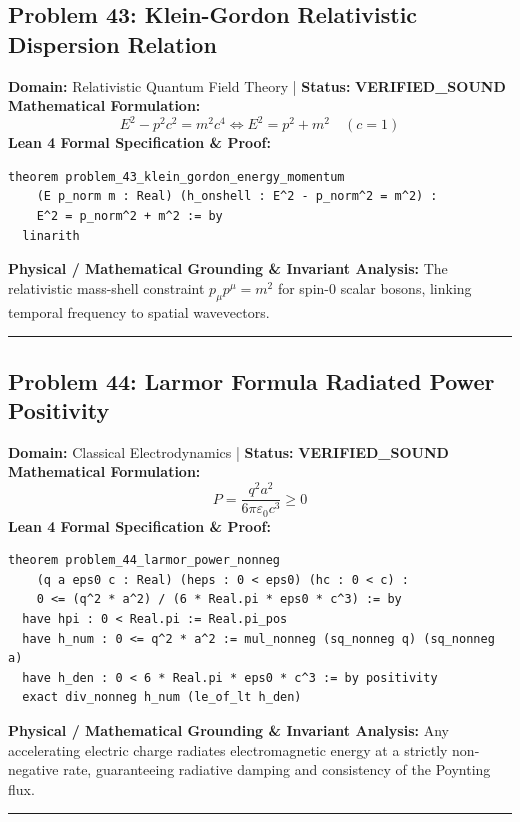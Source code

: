 \documentclass[10pt,a4paper]{article}
\begin{document}
\subsection*{Problem 43: Klein-Gordon Relativistic Dispersion Relation}
\textbf{Domain:} Relativistic Quantum Field Theory \quad | \quad \textbf{Status:} \textcolor{green!70!black}{\textbf{VERIFIED\_SOUND}}\\
\textbf{Mathematical Formulation:}
\begin{equation*}
  E^2 - p^2 c^2 = m^2 c^4 \iff E^2 = p^2 + m^2 \quad (c=1)
\end{equation*}
\textbf{Lean 4 Formal Specification \& Proof:}
\begin{lstlisting}
theorem problem_43_klein_gordon_energy_momentum
    (E p_norm m : Real) (h_onshell : E^2 - p_norm^2 = m^2) :
    E^2 = p_norm^2 + m^2 := by
  linarith
\end{lstlisting}
\textbf{Physical / Mathematical Grounding \& Invariant Analysis:}
The relativistic mass-shell constraint $p_\mu p^\mu = m^2$ for spin-0 scalar bosons, linking temporal frequency to spatial wavevectors.
\vspace{0.8em}\hrule\vspace{0.8em}
\subsection*{Problem 44: Larmor Formula Radiated Power Positivity}
\textbf{Domain:} Classical Electrodynamics \quad | \quad \textbf{Status:} \textcolor{green!70!black}{\textbf{VERIFIED\_SOUND}}\\
\textbf{Mathematical Formulation:}
\begin{equation*}
  P = \frac{q^2 a^2}{6\pi \varepsilon_0 c^3} \ge 0
\end{equation*}
\textbf{Lean 4 Formal Specification \& Proof:}
\begin{lstlisting}
theorem problem_44_larmor_power_nonneg
    (q a eps0 c : Real) (heps : 0 < eps0) (hc : 0 < c) :
    0 <= (q^2 * a^2) / (6 * Real.pi * eps0 * c^3) := by
  have hpi : 0 < Real.pi := Real.pi_pos
  have h_num : 0 <= q^2 * a^2 := mul_nonneg (sq_nonneg q) (sq_nonneg a)
  have h_den : 0 < 6 * Real.pi * eps0 * c^3 := by positivity
  exact div_nonneg h_num (le_of_lt h_den)
\end{lstlisting}
\textbf{Physical / Mathematical Grounding \& Invariant Analysis:}
Any accelerating electric charge radiates electromagnetic energy at a strictly non-negative rate, guaranteeing radiative damping and consistency of the Poynting flux.
\vspace{0.8em}\hrule\vspace{0.8em}
\end{document}
